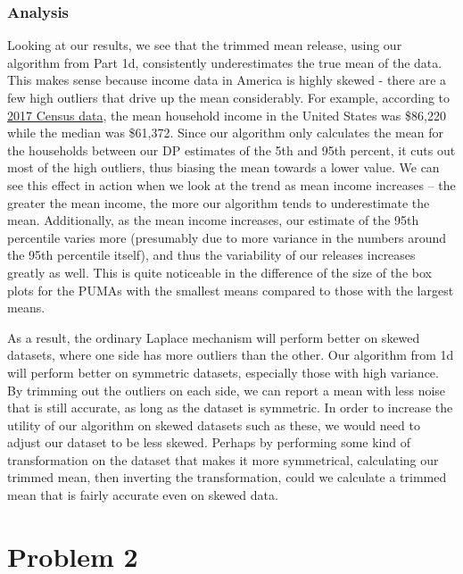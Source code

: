 \documentclass[12pt]{article}
\begin{document}
\subsubsection{Analysis}

\noindent

Looking at our results, we see that the trimmed mean release, using our algorithm from Part 1d, consistently underestimates the true mean of the data. This makes sense because income data in America is highly skewed - there are a few high outliers that drive up the mean considerably. For example, according to \href{https://www2.census.gov/programs-surveys/cps/tables/time-series/historical-income-households/h05.xls}{2017 Census data}, the mean household income in the United States was \$86,220 while the median was \$61,372. Since our algorithm only calculates the mean for the households between our DP estimates of the 5th and 95th percent, it cuts out most of the high outliers, thus biasing the mean towards a lower value. We can see this effect in action when we look at the trend as mean income increases -- the greater the mean income, the more our algorithm tends to underestimate the mean. Additionally, as the mean income increases, our estimate of the 95th percentile varies more (presumably due to more variance in the numbers around the 95th percentile itself), and thus the variability of our releases increases greatly as well. This is quite noticeable in the difference of the size of the box plots for the PUMAs with the smallest means compared to those with the largest means.

\bigskip

As a result, the ordinary Laplace mechanism will perform better on skewed datasets, where one side has more outliers than the other. Our algorithm from 1d will perform better on symmetric datasets, especially those with high variance. By trimming out the outliers on each side, we can report a mean with less noise that is still accurate, as long as the dataset is symmetric. In order to increase the utility of our algorithm on skewed datasets such as these, we would need to adjust our dataset to be less skewed. Perhaps by performing some kind of transformation on the dataset that makes it more symmetrical, calculating our trimmed mean, then inverting the transformation, could we calculate a trimmed mean that is fairly accurate even on skewed data.

\newpage

\section{Problem 2}
\end{document}
